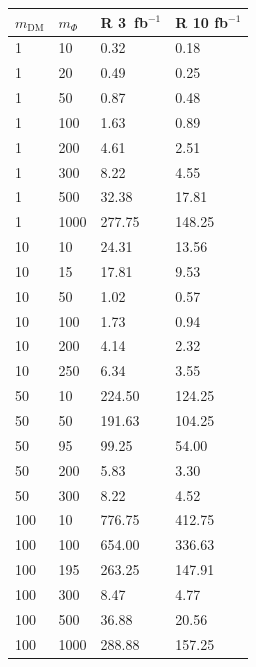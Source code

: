 \begin{table}
  \small
  \centering
\begin{minipage}{.45\textwidth}{
  \begin{tabular}{llll}
    \hline                      
    $m_\textrm{DM}$ & $m_\Phi$  & R 3~fb$^{-1}$ & R 10 fb$^{-1}$ \\ \hline
    1       & 10      & 0.32    & 0.18 \\ \hline
    1       & 20      & 0.49    & 0.25 \\ \hline
    1       & 50      & 0.87    & 0.48 \\ \hline
    1       & 100     & 1.63    & 0.89 \\ \hline
    1       & 200     & 4.61    & 2.51 \\ \hline
    1       & 300     & 8.22    & 4.55 \\ \hline
    1       & 500     & 32.38   & 17.81 \\ \hline
    1       & 1000    & 277.75  & 148.25 \\ \hline
    10      & 10      & 24.31   & 13.56 \\ \hline
    10      & 15      & 17.81   & 9.53 \\ \hline
    10      & 50      & 1.02    & 0.57 \\ \hline
    10      & 100     & 1.73    & 0.94 \\ \hline
    10      & 200     & 4.14    & 2.32 \\ \hline
    10      & 250     & 6.34    & 3.55 \\ \hline
    50      & 10      & 224.50  & 124.25 \\ \hline
    50      & 50      & 191.63  & 104.25 \\ \hline
    50      & 95      & 99.25   & 54.00 \\ \hline
    50      & 200     & 5.83    & 3.30 \\ \hline
    50      & 300     & 8.22    & 4.52 \\ \hline
    100     & 10      & 776.75  & 412.75 \\ \hline
    100     & 100     & 654.00  & 336.63 \\ \hline
    100     & 195     & 263.25  & 147.91 \\ \hline
    100     & 300     & 8.47    & 4.77 \\ \hline
    100     & 500     & 36.88   & 20.56 \\ \hline
    100     & 1000    & 288.88  & 157.25 \\ \hline 

\end{tabular}}
\end{minipage}
\end{table}
